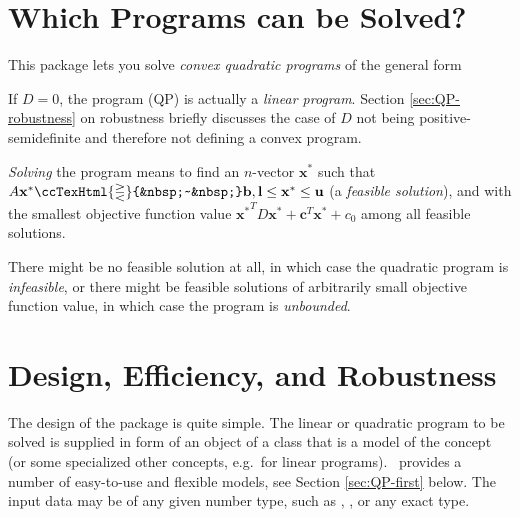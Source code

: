 \newcommand{\qprel}{\ccTexHtml{\gtreqless}{&nbsp;~&nbsp;}}
\newcommand{\qpx}{\mathbf{x}}
\newcommand{\qpl}{\mathbf{l}}
\newcommand{\qpu}{\mathbf{u}}
\newcommand{\qpc}{\mathbf{c}}
\newcommand{\qpb}{\mathbf{b}}
\newcommand{\qpy}{\mathbf{y}}
\newcommand{\qpw}{\mathbf{w}}
\newcommand{\qplambda}{\mathbf{\lambda}}




\minitoc

\section{Which Programs can be Solved?\label{sec:QP-def}}
This package lets you solve \emph{convex quadratic programs} of the 
general form
%


If $D=0$, the program (QP) is actually a \emph{linear program}.
Section \ref{sec:QP-robustness} on robustness briefly discusses
the case of $D$ not being positive-semidefinite and therefore not
defining a convex program. 

\emph{Solving} the program means to find an $n$-vector $\qpx^*$ 
such that $A\qpx^*\qprel \qpb, 
\qpl\leq \qpx^*\leq \qpu$ (a \emph{feasible solution}),
and with the smallest objective function value 
${\qpx^*}^TD\qpx^*+\qpc^T\qpx^*+c_0$ 
among all feasible solutions. 

There might be no feasible solution at all, in which
case the quadratic program is \emph{infeasible}, or there might be
feasible solutions of arbitrarily small objective function value, in
which case the program is \emph{unbounded}.  

\section{Design, Efficiency, and Robustness}
The design of the package is quite simple. The linear
or quadratic program to be solved is supplied in form of an object 
of a class that is a model of the concept  
(or some specialized other concepts, e.g.\ for linear programs). \cgal\
provides a number of easy-to-use and flexible models, see Section 
\ref{sec:QP-first} below. The input data may be of any given number 
type, such as \ccc{double}, \ccc{int}, or any exact type. 

